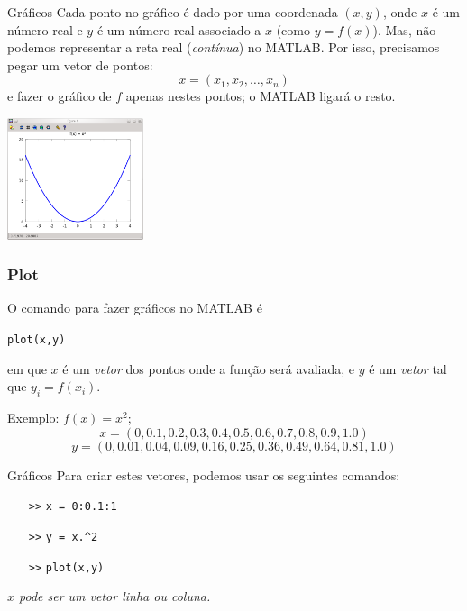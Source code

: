 \documentclass[hyperref={pdfpagelabels=false}]{beamer}
\begin{document}
\begin{frame}{Gráficos}
   Cada ponto no gráfico é dado por uma coordenada $(x,y)$, onde $x$ é um número real e $y$ é um número real associado a $x$ (como $y = f(x)$). Mas, não podemos representar a reta real (\emph{contínua}) no MATLAB. Por isso, precisamos pegar um vetor de pontos:
   $$x = (x_1, x_2, \ldots, x_n)$$
   e fazer o gráfico de $f$ apenas nestes pontos; o MATLAB ligará o resto. 
   \begin{center}
      \includegraphics[width=4cm]{img/grafico_exemplo.png}
   \end{center}
\end{frame}

\begin{frame}
   \frametitle{Plot}
   O comando para fazer gráficos no MATLAB é 
   \begin{center}
      {\texttt{plot(x,y)}}
   \end{center}
   em que $x$ é um \emph{vetor} dos pontos onde a função será avaliada, e $y$ é um \emph{vetor} tal que $y_i = f(x_i)$.

   Exemplo: $f(x) = x^2$; 
   $$x = (0,0.1,0.2,0.3,0.4,0.5,0.6,0.7,0.8,0.9,1.0)$$
   $$y = (0,0.01,0.04,0.09,0.16,0.25,0.36,0.49,0.64,0.81,1.0)$$
\end{frame}

\begin{frame}{Gráficos}
  Para criar estes vetores, podemos usar os seguintes comandos:
  \begin{itemize}
  \item[{\texttt{>>}}] {\texttt{x = 0:0.1:1}}
  \item[{\texttt{>>}}] {\texttt{y = x\alert{.\^{}}2}}
  \item[{\texttt{>>}}] {\texttt{plot(x,y)}}
  \end{itemize}
  \vfill
  \emph{$x$ pode ser um vetor linha ou coluna.}
\end{frame}
\end{document}
